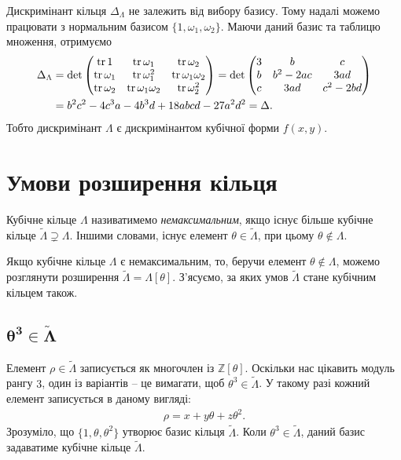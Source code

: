 \documentclass{thesis}
\begin{document}
\begin{remark}
Дискримінант кільця $\Delta_\Lambda$ не залежить від вибору базису. Тому надалі можемо працювати з нормальним базисом $\{1,\omega_1,\omega_2\}$. Маючи даний базис та таблицю множення, отримуємо
\begin{align*}
\Delta_\Lambda & = \det \begin{pmatrix}
\operatorname{tr} 1 & \operatorname{tr} \omega_1 & \operatorname{tr} \omega_2 \\
\operatorname{tr} \omega_1 & \operatorname{tr} \omega_1^2 & \operatorname{tr} \omega_1 \omega_2 \\
\operatorname{tr} \omega_2 & \operatorname{tr} \omega_1 \omega_2 & \operatorname{tr} \omega_2^2
\end{pmatrix} = \det \begin{pmatrix}
3 & b & c \\
b & b^2-2ac & 3ad \\
c & 3ad & c^2-2bd
\end{pmatrix} \\
& = b^2 c^2 - 4c^3 a - 4b^3 d + 18abcd - 27a^2d^2 = \Delta.
\end{align*}
Тобто дискримінант $\Lambda$ є дискримінантом кубічної форми $f(x,y)$.
\end{remark}

\section{Умови розширення кільця}
\begin{definition}
Кубічне кільце $\Lambda$ називатимемо \textit{немаксимальним}, якщо існує більше кубічне кільце $\tilde{\Lambda} \supsetneq \Lambda$. Іншими словами, існує елемент $\theta \in \tilde{\Lambda}$, при цьому $\theta \notin \Lambda$.
\end{definition}

Якщо кубічне кільце $\Lambda$ є немаксимальним, то, беручи елемент $\theta \notin \Lambda$, можемо розглянути розширення $\tilde{\Lambda} = \Lambda[\theta]$. З'ясуємо, за яких умов $\tilde{\Lambda}$ стане кубічним кільцем також.

\subsection{$\boldsymbol{\theta^3 \in \tilde{\Lambda}}$}
Елемент $\rho \in \tilde{\Lambda}$ записується як многочлен із $\mathbb{Z}[\theta]$.  Оскільки нас цікавить модуль рангу $3$, один із варіантів -- це вимагати, щоб $\theta^3 \in \tilde{\Lambda}$. У такому разі кожний елемент записується в даному вигляді:
\begin{align*}
\rho = x + y \theta + z \theta^2.
\end{align*}
Зрозуміло, що $\{ 1,\theta,\theta^2 \}$ утворює базис кільця $\tilde{\Lambda}$. Коли $\theta^3 \in \tilde{\Lambda}$, даний базис задаватиме кубічне кільце $\tilde{\Lambda}$.
\end{document}
